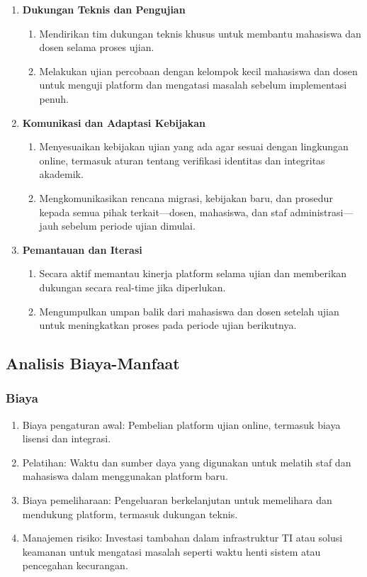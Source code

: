 \begin{enumerate}
	\item \textbf{Dukungan Teknis dan Pengujian}
	\begin{enumerate}
		\item Mendirikan tim dukungan teknis khusus untuk membantu mahasiswa dan dosen selama proses ujian.
		\item Melakukan ujian percobaan dengan kelompok kecil mahasiswa dan dosen untuk menguji platform dan mengatasi masalah sebelum implementasi penuh.
	\end{enumerate}
	
	\item \textbf{Komunikasi dan Adaptasi Kebijakan}
	\begin{enumerate}
		\item Menyesuaikan kebijakan ujian yang ada agar sesuai dengan lingkungan online, termasuk aturan tentang verifikasi identitas dan integritas akademik.
		\item Mengkomunikasikan rencana migrasi, kebijakan baru, dan prosedur kepada semua pihak terkait—dosen, mahasiswa, dan staf administrasi—jauh sebelum periode ujian dimulai.
	\end{enumerate}
	
	\item \textbf{Pemantauan dan Iterasi}
	\begin{enumerate}
		\item Secara aktif memantau kinerja platform selama ujian dan memberikan dukungan secara real-time jika diperlukan.
		\item Mengumpulkan umpan balik dari mahasiswa dan dosen setelah ujian untuk meningkatkan proses pada periode ujian berikutnya.
	\end{enumerate}
	
\end{enumerate}

\subsection{Analisis Biaya-Manfaat}

\subsubsection{Biaya}
\begin{enumerate}
	\item Biaya pengaturan awal: Pembelian platform ujian online, termasuk biaya lisensi dan integrasi.
	\item Pelatihan: Waktu dan sumber daya yang digunakan untuk melatih staf dan mahasiswa dalam menggunakan platform baru.
	\item Biaya pemeliharaan: Pengeluaran berkelanjutan untuk memelihara dan mendukung platform, termasuk dukungan teknis.
	\item Manajemen risiko: Investasi tambahan dalam infrastruktur TI atau solusi keamanan untuk mengatasi masalah seperti waktu henti sistem atau pencegahan kecurangan.
\end{enumerate}

